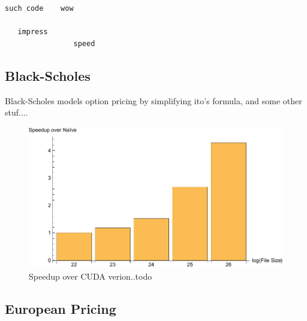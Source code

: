 \begin{verbatim}
such code    wow

   impress
                speed
\end{verbatim}


\subsection{Black-Scholes}
Black-Scholes models option pricing by simplifying ito's formula, and some other stuf....



\begin{figure}
\centering
\includegraphics[scale=0.5]{data/blackscholes.pdf}
\caption{Speedup over CUDA verion..todo}
\label{fig:blackscholes}
\centering
\end{figure}


\subsection{European Pricing}


